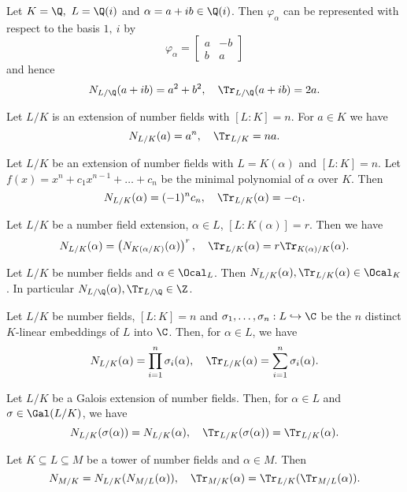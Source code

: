 \begin{exmp*}
	Let \( K = \Q,\ L = \Q(i) \) and \( \alpha = a+ib \in \Q(i) \).
	Then \( \varphi_\alpha \) can be represented with respect to the basis \( 1,\ i \) by
	\[ \varphi_\alpha = \begin{bmatrix}
		a & -b \\ b & a
	\end{bmatrix} \]
	and hence
	\[ N_{L/\Q}(a+ib) = a^2+b^2,\quad \Tr_{L/\Q}(a+ib) = 2a. \]
\end{exmp*}

\begin{lem}
	Let \( L/K \) is an extension of number fields with \( [L:K] = n \). For \( a \in K \) we have
	\[ N_{L/K}(a) = a^n,\quad \Tr_{L/K} = na. \]
\end{lem}

\begin{lem}
	Let \( L/K \) be an extension of number fields with \( L=K(\alpha) \) and \( [L:K]=n \).
	Let \( f(x) = x^n + c_1x^{n-1} + \dots + c_n \) be the minimal polynomial of \( \alpha \) over \( K \).
	Then
	\[ N_{L/K}(\alpha) = (-1)^n c_n,\quad \Tr_{L/K}(\alpha) = -c_1. \]
\end{lem}

\begin{lem}
	Let \( L/K \) be a number field extension, \( \alpha \in L \), \( [L:K(\alpha)] = r \).
	Then we have
	\[ N_{L/K}(\alpha) = \left( N_{K(\alpha/K)}(\alpha) \right)^r,\quad \Tr_{L/K}(\alpha) = r \Tr_{K(\alpha)/K}(\alpha). \]
\end{lem}

\begin{cor}
	Let \( L/K \) be number fields and \( \alpha \in \Ocal_L \).
	Then \( N_{L/K}(\alpha), \Tr_{L/K}(\alpha) \in \Ocal_K \).
	In particular \( N_{L/\Q}(\alpha), \Tr_{L/\Q} \in \Z \).
\end{cor}

\begin{thmn}
	Let \( L/K \) be number fields, \( [L:K] = n \) and \( \sigma_1, \dotsc, \sigma_n: L \hookrightarrow \C \) be the \( n \) distinct \( K \)-linear embeddings of \( L \) into \( \C \).
	Then, for \( \alpha \in L \), we have
	\[ N_{L/K}(\alpha) = \prod_{i=1}^{n} \sigma_i(\alpha),\quad \Tr_{L/K}(\alpha) = \sum_{i=1}^{n} \sigma_i(\alpha). \]
\end{thmn}

\begin{cor}
	Let \( L/K \) be a Galois extension of number fields.
	Then, for \( \alpha \in L \) and \( \sigma \in \Gal(L/K) \), we have
	\[ N_{L/K}(\sigma(\alpha)) = N_{L/K}(\alpha),\quad \Tr_{L/K}(\sigma(\alpha)) = \Tr_{L/K}(\alpha). \]
\end{cor}

\begin{thmn}
	Let \( K \subseteq L \subseteq M \) be a tower of number fields and \( \alpha \in M \).
	Then
	\[ N_{M/K} = N_{L/K}(N_{M/L}(\alpha)),\quad \Tr_{M/K}(\alpha) = \Tr_{L/K}(\Tr_{M/L}(\alpha)). \]
\end{thmn}